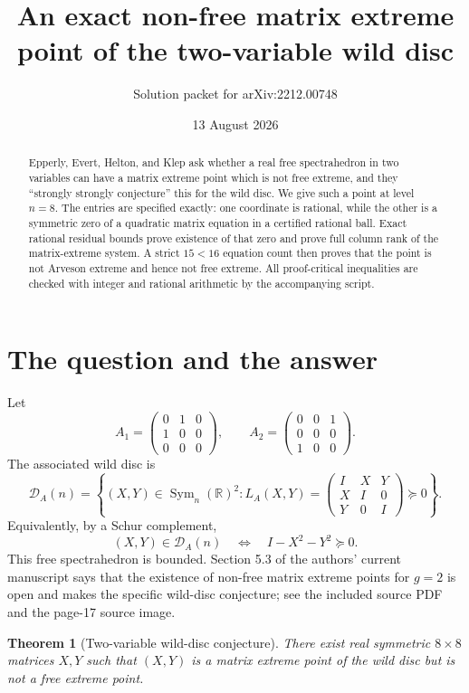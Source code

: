 \documentclass[11pt]{article}
\title{An exact non-free matrix extreme point of the two-variable wild disc}
\author{Solution packet for arXiv:2212.00748}
\date{13 August 2026}
\newtheorem{theorem}{Theorem}
\newcommand{\Sym}{\operatorname{Sym}}
\newcommand{\D}{\mathcal D}
\newcommand{\R}{\mathbb R}
\begin{document}
\maketitle

\begin{abstract}
Epperly, Evert, Helton, and Klep ask whether a real free spectrahedron in two
variables can have a matrix extreme point which is not free extreme, and they
``strongly strongly conjecture'' this for the wild disc.  We give such a
point at level $n=8$.  The entries are specified exactly: one coordinate is
rational, while the other is a symmetric zero of a quadratic matrix equation
in a certified rational ball.  Exact rational residual bounds prove
existence of that zero and prove full column rank of the matrix-extreme
system.  A strict $15<16$ equation count then proves that the point is not
Arveson extreme and hence not free extreme.  All proof-critical inequalities
are checked with integer and rational arithmetic by the accompanying script.
\end{abstract}

\section{The question and the answer}

Let
\[
A_1=\begin{pmatrix}0&1&0\\1&0&0\\0&0&0\end{pmatrix},\qquad
A_2=\begin{pmatrix}0&0&1\\0&0&0\\1&0&0\end{pmatrix}.
\]
The associated wild disc is
\[
 \D_A(n)=\left\{(X,Y)\in\Sym_n(\R)^2:
 L_A(X,Y)=\begin{pmatrix}I&X&Y\\X&I&0\\Y&0&I\end{pmatrix}\succeq0\right\}.
\]
Equivalently, by a Schur complement,
\[
 (X,Y)\in\D_A(n)\quad\Longleftrightarrow\quad I-X^2-Y^2\succeq0.
\]
This free spectrahedron is bounded.  Section 5.3 of the authors' current
manuscript says that the existence of non-free matrix extreme points for
$g=2$ is open and makes the specific wild-disc conjecture; see the included
source PDF and the page-17 source image.

\begin{theorem}[Two-variable wild-disc conjecture]
There exist real symmetric $8\times8$ matrices $X,Y$ such that $(X,Y)$ is a
matrix extreme point of the wild disc but is not a free extreme point.
\end{theorem}
\end{document}
